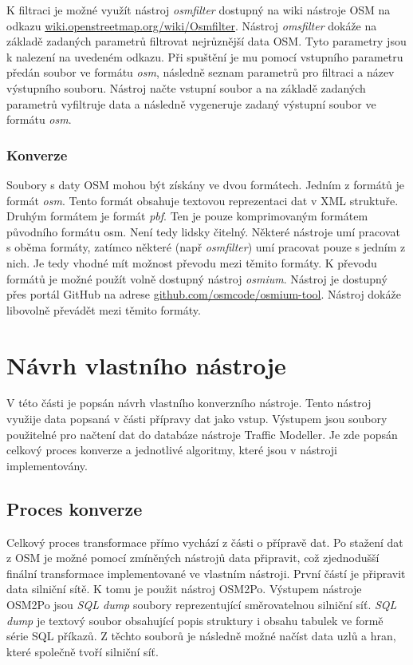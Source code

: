 K filtraci je možné využít nástroj \textit{osmfilter} dostupný na wiki nástroje OSM na odkazu \url{wiki.openstreetmap.org/wiki/Osmfilter}. Nástroj \textit{omsfilter} dokáže na základě zadaných parametrů filtrovat nejrůznější data OSM. Tyto parametry jsou k nalezení na uvedeném odkazu. Při spuštění je mu pomocí vstupního parametru předán soubor ve formátu \textit{osm}, následně seznam parametrů pro filtraci a název výstupního souboru. Nástroj načte vstupní soubor a na základě zadaných parametrů vyfiltruje data a následně vygeneruje zadaný výstupní soubor ve formátu \textit{osm}.

\subsubsection{Konverze}

Soubory s daty OSM mohou být získány ve dvou formátech. Jedním z formátů je formát \textit{osm}. Tento formát obsahuje textovou reprezentaci dat v XML struktuře. Druhým formátem je formát \textit{pbf}. Ten je pouze komprimovaným formátem původního formátu osm. Není tedy lidsky čitelný. Některé nástroje umí pracovat s oběma formáty, zatímco některé (např \textit{osmfilter}) umí pracovat pouze s jedním z nich. Je tedy vhodné mít možnost převodu mezi těmito formáty. K převodu formátů je možné použít volně dostupný nástroj \textit{osmium}. Nástroj je dostupný přes portál GitHub na adrese \url{github.com/osmcode/osmium-tool}. Nástroj dokáže libovolně převádět mezi těmito formáty.

\section{Návrh vlastního nástroje}

V této části je popsán návrh vlastního konverzního nástroje. Tento nástroj využije data popsaná v části přípravy dat jako vstup. Výstupem jsou soubory použitelné pro načtení dat do databáze nástroje Traffic Modeller. Je zde popsán celkový proces konverze a jednotlivé algoritmy, které jsou v nástroji implementovány. 

\subsection{Proces konverze}

Celkový proces transformace přímo vychází z části o přípravě dat. Po stažení dat z OSM je možné pomocí zmíněných nástrojů data připravit, což zjednodušší finální transformace implementované ve vlastním nástroji. První částí je připravit data silniční sítě. K tomu je použit nástroj OSM2Po. Výstupem nástroje OSM2Po jsou \textit{SQL dump} soubory reprezentující směrovatelnou silniční síť. \textit{SQL dump} je textový soubor obsahující popis struktury i obsahu tabulek ve formě série SQL příkazů. Z těchto souborů je následně možné načíst data uzlů a hran, které společně tvoří silniční síť.

